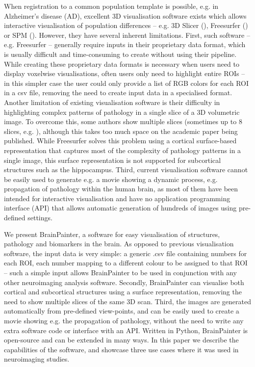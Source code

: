 \documentclass[final,times,twocolumn,authoryear]{elsarticle}
\begin{document}
When registration to a common population template is possible, e.g. in Alzheimer's disease (AD), excellent 3D visualisation software exists  which allows interactive visualisation of population differences -- e.g. 3D Slicer (\cite{pieper20043d}), Freesurfer (\cite{fischl2012freesurfer}) or SPM (\cite{penny2011statistical}). However, they have several inherent limitations. First, such software -- e.g. Freesurfer -- generally require inputs in their proprietary data format, which is usually difficult and time-consuming to create without using their pipeline. While creating these proprietary data formats is necessary when users need to display voxelwise visualisations, often users only need to highlight entire ROIs -- in this simpler case the user could only provide a list of RGB colors for each ROI in a csv file, removing the need to create input data in a specialised format. Another limitation of existing visualisation software is their difficulty in highlighting complex patterns of pathology in a single slice of a 3D volumetric image. To overcome this, some authors show multiple slices (sometimes up to 8 slices, e.g. \cite{migliaccio2015mapping}), although this takes too much space on the academic paper being published. While Freesurfer solves this problem using a cortical surface-based representation that captures most of the complexity of pathology patterns in a single image, this surface representation is not supported for subcortical structures such as the hippocampus. Third, current visualisation software cannot be easily used to generate e.g. a movie showing a dynamic process, e.g. propagation of pathology within the human brain, as most of them have been intended for interactive visualisation and have no application programming interface (API) that allows automatic generation of hundreds of images using pre-defined settings. 

We present BrainPainter, a software for easy visualisation of structures, pathology and biomarkers in the brain. As opposed to previous visualisation software, the input data is very simple: a generic .csv file containing numbers for each ROI, each number mapping to a different colour to be assigned to that ROI -- such a simple input allows BrainPainter to be used in conjunction with any other neuroimaging analysis software. Secondly, BrainPainter can visualise both cortical and subcortical structures using a surface representation, removing the need to show multiple slices of the same 3D scan. Third, the images are generated automatically from pre-defined view-points, and can be easily used to create a movie showing e.g. the propagation of pathology, without the need to write any extra software code or interface with an API. Written in Python, BrainPainter is open-source and can be extended in many ways. In this paper we describe the capabilities of the software, and showcase three use cases where it was used in neuroimaging studies.
\end{document}
